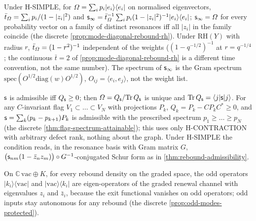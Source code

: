 \begin{proposition}
\label{prop:cusp-modal-rh}
Under H-SIMPLE, for $\varOmega = \sum_ip_i|e_i\rangle\langle e_i|$ on normalised eigenvectors,
$\bar t_{\varOmega} = \sum_ip_i/(1-|z_i|^2)$ and $\mathsf s_\infty = \bar t_{\varOmega}^{-1}\sum_ip_i(1-|z_i|^2)^{-1}|e_i\rangle\langle e_i|$;
$\mathsf s_\infty = \varOmega$ for every probability vector on a family of distinct resonances iff all $|z_i|$ in the
family coincide (the discrete \cref{prop:mode-diagonal-rebound-rh}). Under $\mathrm{RH}(Y)$ with radius $r$,
$\bar t_{\varOmega} = (1-r^2)^{-1}$ independent of the weights ($(1-q^{-1/2})^{-1}$ at $r = q^{-1/4}$; the continuous
$\bar t = 2$ of \cref{prop:mode-diagonal-rebound-rh} is a different time convention, not the same number). The
spectrum of $\mathsf s_\infty$ is the Gram spectrum $\mathrm{spec}(O^{1/2}\mathrm{diag}(w)O^{1/2})$,
$O_{ij} = \langle e_i,e_j\rangle$, not the weight list.
\end{proposition}

\begin{theorem}
\label{thm:cusp-admissible-flags}
$\mathsf s$ is admissible iff $Q_{\mathsf s}\ge0$; then $\varOmega = Q_{\mathsf s}/\mathrm{Tr}\,Q_{\mathsf s}$ is unique and
$\mathrm{Tr}\,Q_{\mathsf s} = \langle j|\mathsf s|j\rangle$. For any $C$-invariant flag $V_1\subset\dots\subset V_N$
with projections $P_k$, $Q_k = P_k - CP_kC^{*}\ge0$, and $\mathsf s = \sum_k(p_k-p_{k+1})P_k$ is admissible with
the prescribed spectrum $p_1\ge\dots\ge p_N$ (the discrete \cref{thm:flag-spectrum-attainable}); this uses
only H-CONTRACTION with arbitrary defect rank, nothing about the graph. Under H-SIMPLE the condition reads,
in the resonance basis with Gram matrix $G$, $\big(\mathsf s_{nm}(1-\bar z_nz_m)\big)\circ G^{-1}$-conjugated
Schur form as in \cref{thm:rebound-admissibility}.
\end{theorem}

\begin{proposition}
\label{prop:cusp-odd-protected}
On $\mathbb C\,\mathrm{vac}\oplus K$, for every rebound density on the graded space, the odd operators
$|k_i\rangle\langle\mathrm{vac}|$ and $|\mathrm{vac}\rangle\langle k_i|$ are eigen-operators of the graded
renewal channel with eigenvalues $z_i$ and $\bar z_i$, because the exit functional vanishes on odd operators;
odd inputs stay autonomous for any rebound (the discrete \cref{prop:odd-modes-protected}).
\end{proposition}

